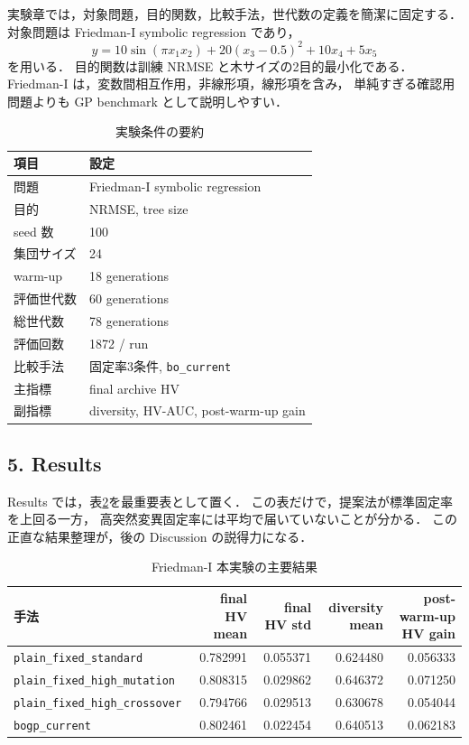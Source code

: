 \documentclass[a4paper,10pt,twocolumn]{ltjsarticle}
\newcommand{\HV}{\mathrm{HV}}
\begin{document}
実験章では，対象問題，目的関数，比較手法，世代数の定義を簡潔に固定する．
対象問題は Friedman-I symbolic regression であり，
\[
y=
10\sin(\pi x_1x_2)
+20(x_3-0.5)^2
+10x_4
+5x_5
\]
を用いる．
目的関数は訓練 NRMSE と木サイズの2目的最小化である．
Friedman-I は，変数間相互作用，非線形項，線形項を含み，
単純すぎる確認用問題よりも GP benchmark として説明しやすい\cite{mcdermott2012,white2013,lacava2021}．

\begin{table}[tb]
\centering
\caption{実験条件の要約}
\label{tab:experiment-setting-plan}
\begin{tabular}{ll}
\toprule
項目 & 設定 \\
\midrule
問題 & Friedman-I symbolic regression \\
目的 & NRMSE, tree size \\
seed 数 & 100 \\
集団サイズ & 24 \\
warm-up & 18 generations \\
評価世代数 & 60 generations \\
総世代数 & 78 generations \\
評価回数 & 1872 / run \\
比較手法 & 固定率3条件, \texttt{bo\_current} \\
主指標 & final archive \(\HV\) \\
副指標 & diversity, HV-AUC, post-warm-up gain \\
\bottomrule
\end{tabular}
\end{table}

\subsection{5. Results}

Results では，表\ref{tab:main-results-plan}を最重要表として置く．
この表だけで，提案法が標準固定率を上回る一方，
高突然変異固定率には平均で届いていないことが分かる．
この正直な結果整理が，後の Discussion の説得力になる．

\begin{table}[tb]
\centering
\caption{Friedman-I 本実験の主要結果}
\label{tab:main-results-plan}
\begin{tabular}{lrrrr}
\toprule
手法 & final HV mean & final HV std & diversity mean & post-warm-up HV gain \\
\midrule
\texttt{plain\_fixed\_standard} & 0.782991 & 0.055371 & 0.624480 & 0.056333 \\
\texttt{plain\_fixed\_high\_mutation} & 0.808315 & 0.029862 & 0.646372 & 0.071250 \\
\texttt{plain\_fixed\_high\_crossover} & 0.794766 & 0.029513 & 0.630678 & 0.054044 \\
\texttt{bogp\_current} & 0.802461 & 0.022454 & 0.640513 & 0.062183 \\
\bottomrule
\end{tabular}
\end{table}
\end{document}

